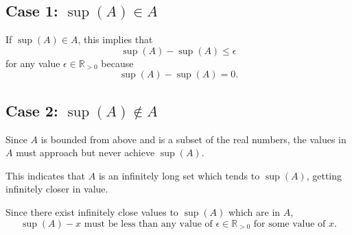 \documentclass[12pt,oneside]{article}
\theoremstyle{definition}
\begin{document}
\subsection*{Case 1: \( \sup(A) \in A \)}
If \( \sup(A) \in A \), this implies that 
\[
\sup(A) - \sup(A) \leq \epsilon
\]
for any value \( \epsilon \in \mathbb{R}_{>0} \) because
\[
\sup(A) - \sup(A) = 0.
\]

\subsection*{Case 2: \( \sup(A) \notin A \)}
Since \( A \) is bounded from above and is a subset of the real numbers, the values in \( A \) must approach but never achieve \( \sup(A) \). 

This indicates that \( A \) is an infinitely long set which tends to \( \sup(A) \), getting infinitely closer in value.

Since there exist infinitely close values to \( \sup(A) \) which are in \( A \),
\[
\sup(A) - x \text{ must be less than any value of } \epsilon \in \mathbb{R}_{>0} \text{ for some value of } x.
\]
\end{document}
